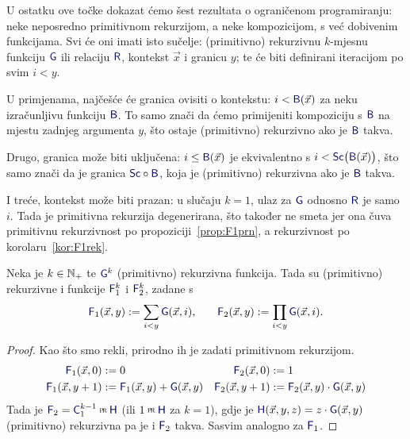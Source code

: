 \begin{napomena}[{name=[izračunljive granice i prazni konteksti]}]\label{nap:igpk}
	U ostatku ove točke dokazat ćemo šest rezultata o ograničenom programiranju: neke neposredno primitivnom rekurzijom, a neke kompozicijom, s već dobivenim funkcijama. Svi će oni imati isto sučelje: (primitivno) rekurzivnu $k$-mjesnu funkciju $\f G$ ili relaciju $\f R$, kontekst $\vec x$ i granicu $y$; te će biti definirani iteracijom po svim $i<y$.
	
	U primjenama, najčešće će granica ovisiti o kontekstu: $i<\f B(\vec x)$ za neku izračunljivu funkciju $\f B$. To samo znači da ćemo primijeniti kompoziciju s $\f B$ na mjestu zadnjeg argumenta $y$, što ostaje (primitivno) rekurzivno ako je $\f B$ takva.

	Drugo, granica može biti uključena: $i\le\f B(\vec x)$ je ekvivalentno s $i<\f{Sc}\bigl(\f B(\vec x)\bigr)$, što samo znači da je granica $\f{Sc}\circ\f B$, koja je (primitivno) rekurzivna ako je $\f B$ takva.

	I treće, kontekst može biti prazan: u slučaju $k=1$, ulaz za $\f G$ odnosno $\f R$ je samo $i$. Tada je primitivna rekurzija degenerirana, što također ne smeta jer ona čuva primitivnu rekurzivnost po propoziciji~\ref{prop:F1prn}, a rekurzivnost po korolaru~\ref{kor:F1rek}.
\end{napomena}

\begin{lema}[{name=[ograničene sume i produkti čuvaju (primitivnu) rekurzivnost]}]\label{lm:sumprodrek}
    Neka je $k\in{\mathbb N}_+$ te $\f G^k$ (primitivno) rekurzivna funkcija. Tada su (primitivno) rekurzivne i funkcije $\f F_1^k$ i $\f F_2^k$, zadane s
\begin{equation}
    \f F_1(\vec x,y):=\sum_{i<y}\f G(\vec x,i)\text,\qquad
    \f F_2(\vec x,y):=\prod_{i<y}\f G(\vec x,i)\text.
\end{equation}
\end{lema}
\begin{proof}
    Kao što smo rekli, prirodno ih je zadati primitivnom rekurzijom.
    \begin{align}
        \label{eq:sumG1}\f F_1(\vec x,0)&:=0&\f F_2(\vec x,0)&:=1
        \\
        \label{eq:sumH1}
        \f F_1(\vec x,y+1)&:=\f F_1(\vec x,y)+\f G(\vec x,y)&
        \f F_2(\vec x,y+1)&:=\f F_2(\vec x,y)\cdot\f G(\vec x,y)
    \end{align}
	Tada je $\f F_2=\f C_1^{k-1}\pr\f H$ (ili $1\pr\f H$ za $k=1$), gdje je $\f H(\vec x,y,z)=z\cdot\f G(\vec x,y)$ (primitivno) rekurzivna pa je i $\f F_2$ takva. Sasvim analogno za $\f F_1$.
\end{proof}

